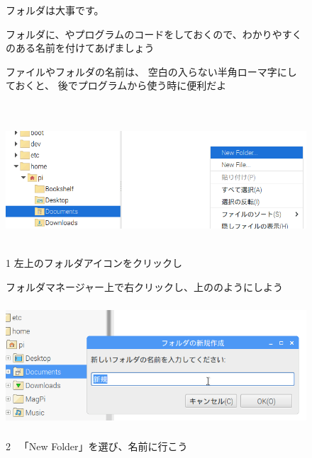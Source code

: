 \documentclass[a4paper,12pt]{jarticle}
\begin{document}
\begin{figure}[hb]
  \centering
  \begin{minipage}{0.8\textwidth}
    {	\large
      フォルダは大事です。

      フォルダに、やプログラムのコードをしておくので、わかりやすくのある名前を付けてあげましょう

      \bigskip
      ファイルやフォルダの名前は、
      空白の入らない半角ローマ字にしておくと、
      後でプログラムから使う時に便利だよ
    }
  \end{minipage}
\end{figure}
\clearpage
\begin{figure}[ht]
  \vspace{8mm}\\
  \centering
  \includegraphics[width=13.33cm,height=4.74cm]{textbook-img034.png}
  \begin{minipage}{\textwidth}
    1
    左上のフォルダアイコンをクリックし

    フォルダマネージャー上で右クリックし、上ののようにしよう
  \end{minipage}

  \centering
  \includegraphics[width=12.483cm,height=4.584cm]{textbook-img036.png}
  \begin{minipage}{\textwidth}
    2
    \ 「New Folder」を選び、名前に行こう
  \end{minipage}


\end{figure}
\end{document}

